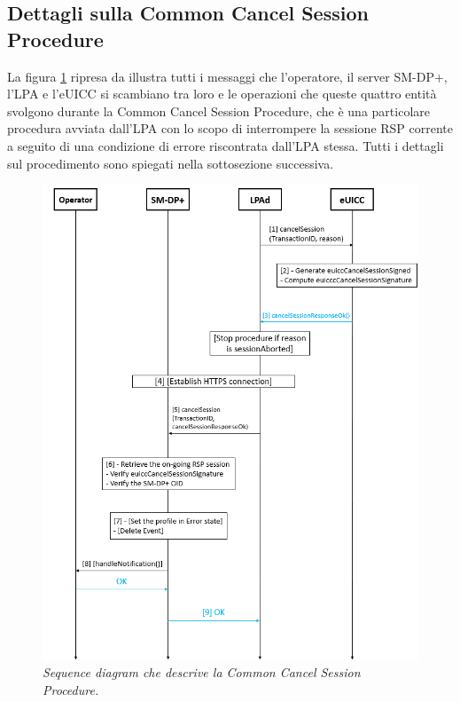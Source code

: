 \documentclass[10pt, oneside]{book}
\begin{document}
\subsection{Dettagli sulla Common Cancel Session Procedure}\label{sec:common-cancel-session}
La figura  \ref{fig:common-cancel-session} ripresa da \cite{GSMA-docs-new} illustra tutti i messaggi che l'operatore, il server SM-DP+, l'LPA e l'eUICC si scambiano tra loro e le operazioni che queste quattro entità svolgono durante la Common Cancel Session Procedure, che è una particolare procedura avviata dall'LPA con lo scopo di interrompere la sessione RSP corrente a seguito di una condizione di errore riscontrata dall'LPA stessa. Tutti i dettagli sul procedimento \cite{GSMA-docs-new} sono spiegati nella sottosezione successiva.
\begin{figure}
\includegraphics[width=\linewidth]{common-cancel-session.png}
\caption{\textit{Sequence diagram che descrive la Common Cancel Session Procedure.}}
\label{fig:common-cancel-session}
\end{figure}
\end{document}
